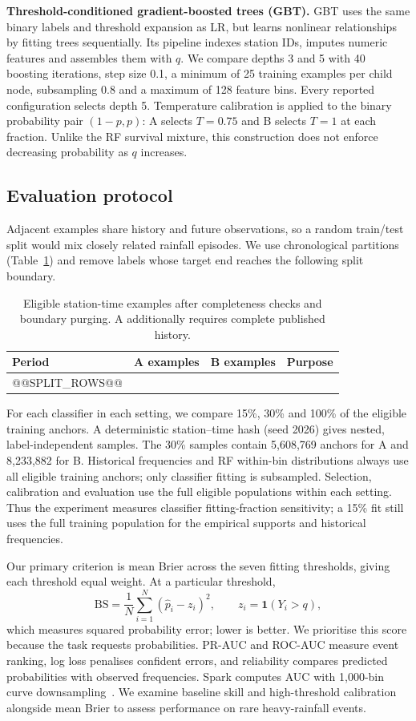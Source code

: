 \textbf{Threshold-conditioned gradient-boosted trees (GBT).} GBT uses the same binary labels and threshold expansion as LR, but learns nonlinear relationships by fitting trees sequentially. Its pipeline indexes station IDs, imputes numeric features and assembles them with $q$. We compare depths 3 and 5 with 40 boosting iterations, step size 0.1, a minimum of 25 training examples per child node, subsampling 0.8 and a maximum of 128 feature bins. Every reported configuration selects depth 5. Temperature calibration is applied to the binary probability pair $(1-p,p)$: A selects $T=0.75$ and B selects $T=1$ at each fraction. Unlike the RF survival mixture, this construction does not enforce decreasing probability as $q$ increases.

\subsection{Evaluation protocol}
Adjacent examples share history and future observations, so a random train/test split would mix closely related rainfall episodes. We use chronological partitions (Table~\ref{tab:t2splits}) and remove labels whose target end reaches the following split boundary.
\begin{table}[htbp]\centering\small
\begin{tabular}{lrrp{.29\linewidth}}\toprule
Period & A examples & B examples & Purpose\\\midrule
@@SPLIT_ROWS@@
\bottomrule\end{tabular}
\caption{Eligible station-time examples after completeness checks and boundary purging. A additionally requires complete published history.}\label{tab:t2splits}
\end{table}

For each classifier in each setting, we compare 15\%, 30\% and 100\% of the eligible training anchors. A deterministic station--time hash (seed 2026) gives nested, label-independent samples. The 30\% samples contain 5,608,769 anchors for A and 8,233,882 for B. Historical frequencies and RF within-bin distributions always use all eligible training anchors; only classifier fitting is subsampled. Selection, calibration and evaluation use the full eligible populations within each setting. Thus the experiment measures classifier fitting-fraction sensitivity; a 15\% fit still uses the full training population for the empirical supports and historical frequencies.

Our primary criterion is mean Brier across the seven fitting thresholds, giving each threshold equal weight. At a particular threshold,
\[
\mathrm{BS}=\frac{1}{N}\sum_{i=1}^{N}(\widehat p_i-z_i)^2,
\qquad z_i=\mathbf1(Y_i>q),
\]
which measures squared probability error; lower is better. We prioritise this score because the task requests probabilities. PR-AUC and ROC-AUC measure event ranking, log loss penalises confident errors, and reliability compares predicted probabilities with observed frequencies. Spark computes AUC with 1,000-bin curve downsampling~\cite{sparkeval}. We examine baseline skill and high-threshold calibration alongside mean Brier to assess performance on rare heavy-rainfall events.

